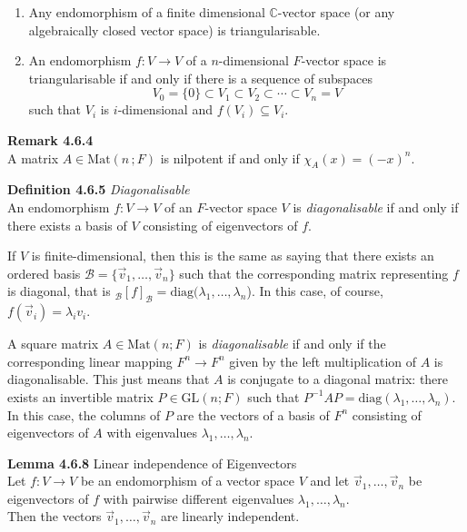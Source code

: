 \documentclass[8pt,landscape]{article}
\begin{document}
\begin{multicols}{3}
\begin{enumerate}
        \item Any endomorphism of a finite dimensional $\mathbb{C}$-vector space
            (or any algebraically closed vector space) is triangularisable.

        \item An endomorphism $f : V \to V$ of a $n$-dimensional $F$-vector space is
            triangularisable if and only if there is a sequence of subspaces
            \[
                V_0 = \{0\} \subset V_1 \subset V_2 \subset \cdots \subset V_n = V
            \]
            such that $V_i$ is $i$-dimensional and $f(V_i) \subseteq V_i$.
    \end{enumerate}

    \textbf{Remark 4.6.4} \\
    A matrix $A \in \mathrm{Mat}(n\, ; F)$ is nilpotent if and only if
    $\chi_A(x) = {(-x)}^n$.

    \textbf{Definition 4.6.5} \emph{Diagonalisable} \\
    An endomorphism $f : V \to V$ of an $F$-vector space $V$ is \emph{diagonalisable}
    if and only if there exists a basis of $V$ consisting of eigenvectors of $f$.

    If $V$ is finite-dimensional, then this is the same as saying that there exists an
    ordered basis $\mathcal{B} = \{ \vec{v}_1, \ldots, \vec{v}_n \}$
    such that the corresponding matrix representing $f$ is diagonal,
    that is $_\mathcal{B}{[f]}_\mathcal{B} = \mathrm{diag}(\lambda_1, \ldots, \lambda_n$).
    In this case, of course, $f(\vec{v}_i) = \lambda_i v_i$.

    A square matrix $A \in \mathrm{Mat}(n; F)$ is \emph{diagonalisable} if and only if
    the corresponding linear mapping $F^n \to F^n$ given by the left multiplication of $A$
    is diagonalisable.
    This just means that $A$ is conjugate to a diagonal matrix:
    there exists an invertible matrix $P \in \mathrm{GL}(n; F)$ such that
    $P^{-1} A P = \mathrm{diag}(\lambda_1, \ldots, \lambda_n)$.
    In this case, the columns of $P$ are the vectors of a basis of $F^n$ consisting of
    eigenvectors of $A$ with eigenvalues $\lambda_1, \ldots, \lambda_n$.

    \textbf{Lemma 4.6.8} Linear independence of Eigenvectors \\
    Let $f : V \to V$ be an endomorphism of a vector space $V$ and let
    $\vec{v}_1, \ldots, \vec{v}_n$ be eigenvectors of $f$ with pairwise different
    eigenvalues $\lambda_1, \ldots, \lambda_n$. \\
    Then the vectors $\vec{v}_1, \ldots, \vec{v}_n$ are linearly independent.


\end{multicols}
\end{document}

